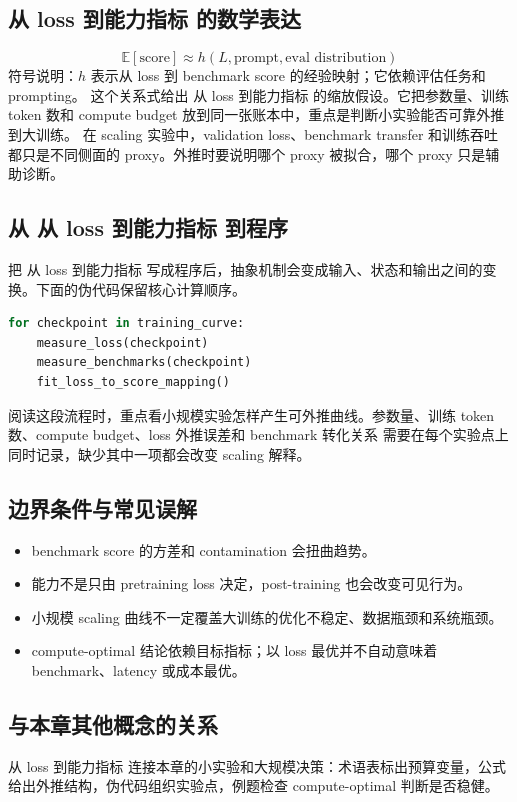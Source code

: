\documentclass[a4paper]{article}
\begin{document}
\subsection{从 loss 到能力指标 的数学表达}
\[\mathbb{E}[\text{score}]\approx h(L,\text{prompt},\text{eval distribution})\]
符号说明：\(h\) 表示从 loss 到 benchmark score 的经验映射；它依赖评估任务和 prompting。
这个关系式给出 从 loss 到能力指标 的缩放假设。它把参数量、训练 token 数和 compute budget 放到同一张账本中，重点是判断小实验能否可靠外推到大训练。
在 scaling 实验中，validation loss、benchmark transfer 和训练吞吐都只是不同侧面的 proxy。外推时要说明哪个 proxy 被拟合，哪个 proxy 只是辅助诊断。
\subsection{从 从 loss 到能力指标 到程序}
把 从 loss 到能力指标 写成程序后，抽象机制会变成输入、状态和输出之间的变换。下面的伪代码保留核心计算顺序。
\begin{lstlisting}[language=Python]
for checkpoint in training_curve:
    measure_loss(checkpoint)
    measure_benchmarks(checkpoint)
    fit_loss_to_score_mapping()
\end{lstlisting}
阅读这段流程时，重点看小规模实验怎样产生可外推曲线。参数量、训练 token 数、compute budget、loss 外推误差和 benchmark 转化关系 需要在每个实验点上同时记录，缺少其中一项都会改变 scaling 解释。
\subsection{边界条件与常见误解}
\begin{itemize}
\item benchmark score 的方差和 contamination 会扭曲趋势。
\item 能力不是只由 pretraining loss 决定，post-training 也会改变可见行为。
\item 小规模 scaling 曲线不一定覆盖大训练的优化不稳定、数据瓶颈和系统瓶颈。
\item compute-optimal 结论依赖目标指标；以 loss 最优并不自动意味着 benchmark、latency 或成本最优。
\end{itemize}
\subsection{与本章其他概念的关系}
从 loss 到能力指标 连接本章的小实验和大规模决策：术语表标出预算变量，公式给出外推结构，伪代码组织实验点，例题检查 compute-optimal 判断是否稳健。
\end{document}
